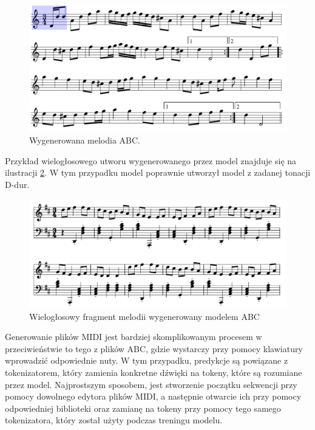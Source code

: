\documentclass[data-science]{agh-wi} %
\begin{document}
\begin{figure}[ht!]
    \begin{center}
        \includegraphics[width=0.9\linewidth]{./img/abc_gen_nice1.pdf}
    \end{center}
    \caption{Wygenerowana melodia ABC.}\label{fig:music_gen1}
\end{figure}

Przykład wielogłosowego utworu wygenerowanego przez model znajduje się na ilustracji \ref*{fig:vvv_abc}. W tym przypadku model poprawnie utworzył model z zadanej tonacji D-dur.

\begin{figure}[ht!]
    \centering
    \includegraphics[width=0.9\linewidth]{./img/example.pdf}
    \caption{Wielogłosowy fragment melodii wygenerowany modelem ABC}\label{fig:vvv_abc}
\end{figure}

Generowanie plików MIDI jest bardziej skomplikowanym procesem w przeciwieństwie to tego z plików ABC, gdzie wystarczy przy pomocy klawiatury wprowadzić odpowiednie nuty. W tym przypadku, predykcje są powiązane z tokenizatorem, który zamienia konkretne dźwięki na tokeny, które są rozumiane przez model. Najprostszym sposobem, jest stworzenie początku sekwencji przy pomocy dowolnego edytora plików MIDI, a następnie otwarcie ich przy pomocy odpowiedniej biblioteki oraz zamianę na tokeny przy pomocy tego samego tokenizatora, który został użyty podczas treningu modelu.
\end{document}
